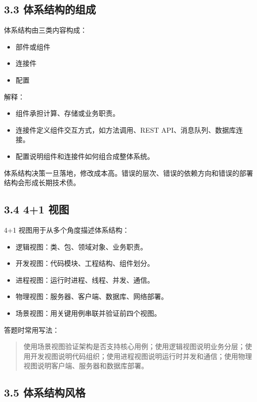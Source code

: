 \documentclass[UTF8,zihao=-4]{ctexart}
\begin{document}
\subsection{3.3 体系结构的组成}

体系结构由三类内容构成：

\begin{itemize}
\item 部件或组件
\item 连接件
\item 配置
\end{itemize}

解释：

\begin{itemize}
\item 组件承担计算、存储或业务职责。
\item 连接件定义组件交互方式，如方法调用、REST API、消息队列、数据库连接。
\item 配置说明组件和连接件如何组合成整体系统。
\end{itemize}

体系结构决策一旦落地，修改成本高。错误的层次、错误的依赖方向和错误的部署结构会形成长期技术债。

\subsection{3.4 4+1 视图}

4+1 视图用于从多个角度描述体系结构：

\begin{itemize}
\item 逻辑视图：类、包、领域对象、业务职责。
\item 开发视图：代码模块、工程结构、组件划分。
\item 进程视图：运行时进程、线程、并发、通信。
\item 物理视图：服务器、客户端、数据库、网络部署。
\item 场景视图：用关键用例串联并验证前四个视图。
\end{itemize}

答题时常用写法：

\begin{quote}
使用场景视图验证架构是否支持核心用例；使用逻辑视图说明业务分层；使用开发视图说明代码组织；使用进程视图说明运行时并发和通信；使用物理视图说明客户端、服务器和数据库部署。
\end{quote}

\subsection{3.5 体系结构风格}
\end{document}
